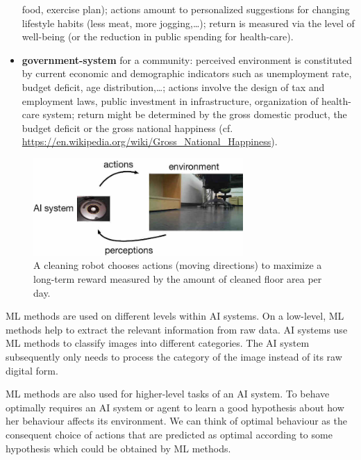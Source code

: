 \documentclass[12pt]{report}
\begin{document}
\begin{itemize}
food, exercise plan);  actions amount to personalized suggestions 
for changing lifestyle habits (less meat, more jogging,\ldots); return 
is measured via the level of well-being (or the reduction in public 
spending for health-care).  
\item {\bf government-system} for a community: perceived environment 
is constituted by current economic and demographic indicators such as 
unemployment rate, budget deficit, age distribution,\ldots; actions involve 
the design of tax and employment laws, public investment in infrastructure, 
organization of health-care system; return might be determined by the 
gross domestic product, the budget deficit or the gross national 
happiness (cf. \url{https://en.wikipedia.org/wiki/Gross_National_Happiness}). 
\end{itemize}
	\vspace*{2mm}
\begin{figure}[htbp]
	\begin{center}
		\includegraphics[width=8cm]{AIsystemEnvML1.jpg}  
		\caption{A cleaning robot chooses actions (moving directions) to maximize 
			a long-term reward measured by the amount of cleaned floor area per day.}
		\label{fig:cleaning_robot}
	\end{center}
\end{figure}

ML methods are used on different levels within AI systems. 
On a low-level, ML methods help to extract the relevant information 
from raw data. AI systems use  ML methods to classify images into 
different categories. The AI system subsequently only needs to process 
the category of the image instead of its raw digital form. 

ML methods are also used for higher-level tasks of an AI system. 
To behave optimally requires an AI system or agent to learn a good 
hypothesis about how her behaviour affects its environment. We can 
think of optimal behaviour as the consequent choice of actions 
that are predicted as optimal according to some hypothesis which 
could be obtained by ML methods. 

\end{document}
